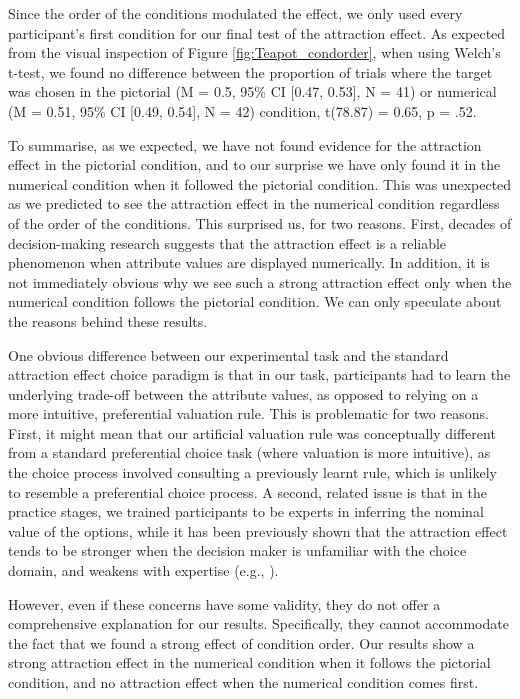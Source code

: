 \documentclass[11pt,a4paper]{article}
\begin{document}
Since the order of the conditions modulated the effect, we only used every participant's first condition for our final test of the attraction effect. As expected from the visual inspection of Figure \ref{fig:Teapot_condorder}, when using Welch's t-test, we found no difference between the proportion of trials where the target was chosen in the pictorial (M = 0.5, 95\% CI [0.47, 0.53], N = 41) or numerical (M = 0.51, 95\% CI [0.49, 0.54], N = 42) condition, t(78.87) = 0.65, p = .52.

To summarise, as we expected, we have not found evidence for the attraction effect in the pictorial condition, and to our surprise we have only found it in the numerical condition when it followed the pictorial condition. This was unexpected as we predicted to see the attraction effect in the numerical condition regardless of the order of the conditions. This surprised us, for two reasons. First, decades of decision-making research suggests that the attraction effect is a reliable phenomenon when attribute values are displayed numerically. In addition, it is not immediately obvious why we see such a strong attraction effect only when the numerical condition follows the pictorial condition. We can only speculate about the reasons behind these results.

One obvious difference between our experimental task and the standard attraction effect choice paradigm is that in our task, participants had to learn the underlying trade-off between the attribute values, as opposed to relying on a more intuitive, preferential valuation rule. This is problematic for two reasons. First, it might mean that our artificial valuation rule was conceptually different from a standard preferential choice task (where valuation is more intuitive), as the choice process involved consulting a previously learnt rule, which is unlikely to resemble a preferential choice process. A second, related issue is that in the practice stages, we trained participants to be experts in inferring the nominal value of the options, while it has been previously shown that the attraction effect tends to be stronger when the decision maker is unfamiliar with the choice domain, and weakens with expertise (e.g., ). 

However, even if these concerns have some validity, they do not offer a comprehensive explanation for our results. Specifically, they cannot accommodate the fact that we found a strong effect of condition order. Our results show a strong attraction effect in the numerical condition when it follows the pictorial condition, and no attraction effect when the numerical condition comes first.
\end{document}
